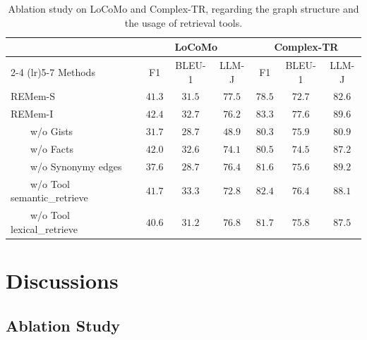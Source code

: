 \documentclass{article} %
\newcommand{\ours}{REMem\xspace}
\begin{document}
\begin{table}[tb]
\centering
\small
\caption{Ablation study on LoCoMo and Complex-TR, regarding the graph structure and the usage of retrieval tools.}
\vspace{0.2em}
\addtolength{\tabcolsep}{-3pt}
\begin{tabular}{l|ccc|ccc}
\toprule
 & \multicolumn{3}{c|}{LoCoMo} & \multicolumn{3}{c}{Complex-TR} \\
 \cmidrule(lr){2-4} \cmidrule(lr){5-7} 
Methods & F1 & BLEU-1 & LLM-J &  F1 & BLEU-1 & LLM-J \\ \midrule
\ours-S & $41.3$ & $31.5$ & $\mathbf{77.5}$ & $78.5$ & $72.7$ & $82.6$ \\
\ours-I & $\mathbf{42.4}$ & $32.7$ & ${76.2}$ & $\mathbf{83.3}$ & $\mathbf{77.6}$ & $\mathbf{89.6}$ \\
\ \ \ \ w/o Gists & $31.7$ & $28.7$ & $48.9$ & $80.3$ & ${75.9}$ & $80.9$ \\
\ \ \ \ w/o Facts & ${42.0}$ & ${32.6}$ & $74.1$ & ${80.5}$ & $74.5$ & $87.2$ \\
\ \ \ \ w/o Synonymy edges & $37.6$ & $28.7$ & $76.4$ & $81.6$ & $75.6$ & $89.2$   \\
\ \ \ \ w/o Tool semantic\_retrieve & $41.7$ & $\mathbf{33.3}$ & $72.8$ & $82.4$ & $76.4$ & $88.1$ \\
\ \ \ \ w/o Tool lexical\_retrieve & $40.6$ & $31.2$ & $76.8$ & $81.7$ & $75.8$ & $87.5$ \\ 
\bottomrule
\end{tabular}
\label{tab:ablation}
\vspace{-10pt}
\end{table}

\section{Discussions}


\subsection{Ablation Study}
\end{document}
